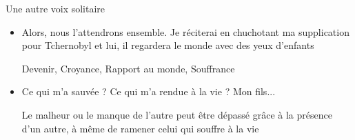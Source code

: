 \documentclass[french,a4paper,11pt,answers]{exam}
\newcommand{\cit}[2]{\og #1 \fg{} \begin{solution}{ #2 }\end{solution}} %
\begin{document}
	\begin{cadre}{Une autre voix solitaire}
		\begin{itemize}
			\item \cit{Alors, nous l'attendrons ensemble. Je réciterai en chuchotant ma supplication pour Tchernobyl et lui, il regardera le monde avec des yeux d'enfants}
				{Devenir, Croyance, Rapport au monde, Souffrance}
			\item \cit{Ce qui m'a sauvée ? Ce qui m'a rendue à la vie ? Mon fils...}
				{Le malheur ou le manque de l'autre peut être dépassé grâce à la présence d'un autre, à même de ramener celui qui souffre à la vie}
		\end{itemize}
	\end{cadre}
\end{document}
